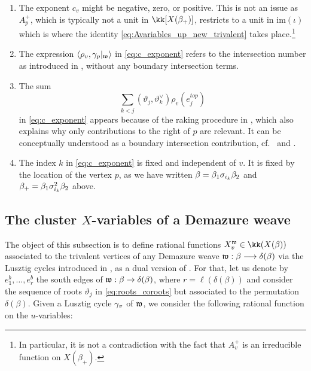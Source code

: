 \begin{enumerate}
    \item The exponent $c_v$ might be negative, zero, or positive. This is not an issue as $A_p^+$, which is typically not a unit in $\kk[X(\beta_+)]$, restricts to a unit in $\mbox{im}(\iota)$ which is where the identity \eqref{eq:Avariables_up_new_trivalent} takes place.\footnote{In particular, it is not a contradiction with the fact that $A_v^+$ is an irreducible function on $X(\beta_+)$.}\\

    \item The expression $\langle\rho_v,\gamma_p|_{\mathfrak{w}}\rangle$ in \eqref{eq:c_exponent} refers to the intersection number as introduced in , without any boundary intersection terms.\\

    \item The sum
    $$\sum_{k<j}(\vartheta_j,\vartheta_{k}^\vee)\rho_v(e_j^{top})$$
    in \eqref{eq:c_exponent} appears because of the raking procedure in \cite[Section 5.1]{CGGLSS25}, which also explains why only contributions to the right of $p$ are relevant. It can be conceptually understood as a boundary intersection contribution, cf.~ and \cite[Definition 4.24]{CGGLSS25}.\\
    
    \item The index $k$ in \eqref{eq:c_exponent} is fixed and independent of $v$. It is fixed by the location of the vertex $p$, as we have written $\beta=\beta_1\sigma_{i_k}\beta_2$ and $\beta_+=\beta_1\sigma_{i_k}^2\beta_2$ above.
\end{enumerate}

\subsection{The cluster $X$-variables of a Demazure weave}\label{ssec:cluster_Xvariables_weave} The object of this subsection is to define rational functions $X^\w_v\in\kk(X(\beta))$ associated to the trivalent vertices of any Demazure weave $\mathfrak{w}:\beta\longrightarrow\delta(\beta)$ via the Lusztig cycles introduced in , as a dual version of . For that, let us denote by $e_1^{b},\ldots,e_r^{b}$ the south edges of $\mathfrak{w}:\beta\to\delta(\beta)$, where $r=\ell(\delta(\beta))$ and consider the sequence of roots $\vartheta_j$ in \eqref{eq:roots_coroots} but associated to the permutation $\delta(\beta)$. Given a Lusztig cycle $\gamma_v$ of $\mathfrak{w}$, we consider the following rational function on the $u$-variables:

